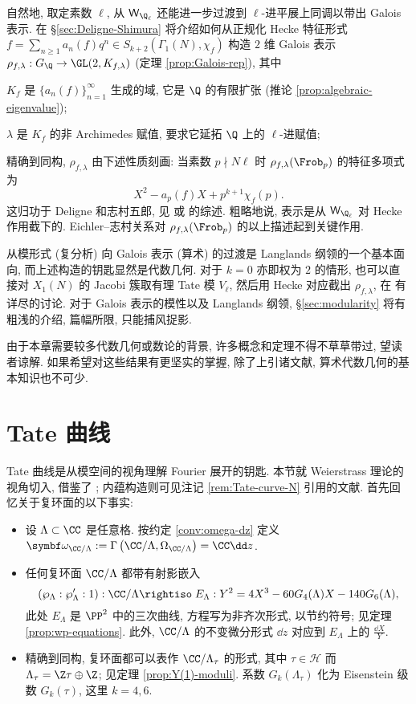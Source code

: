 自然地, 取定素数 $\ell$, 从 $\mathsf{W}_{\Q_\ell}$ 还能进一步过渡到 $\ell$-进平展上同调以带出 Galois 表示. 在 \S\ref{sec:Deligne-Shimura} 将介绍如何从正规化 Hecke 特征形式 $f = \sum_{n \geq 1} a_n(f) q^n \in S_{k+2}(\Gamma_1(N), \chi_f)$ 构造 $2$ 维 Galois 表示 $\rho_{f, \lambda}: G_{\Q} \to \GL(2, K_{f, \lambda})$ (定理 \ref{prop:Galois-rep}), 其中
\begin{compactitem}
	\item $K_f$ 是 $\{ a_n(f) \}_{n=1}^\infty$ 生成的域, 它是 $\Q$ 的有限扩张 (推论 \ref{prop:algebraic-eigenvalue});
	\item $\lambda$ 是 $K_f$ 的非 Archimedes 赋值, 要求它延拓 $\Q$ 上的 $\ell$-进赋值;
\end{compactitem}
精确到同构, $\rho_{f, \lambda}$ 由下述性质刻画: 当素数 $p \nmid N\ell$ 时 $\rho_{f, \lambda}(\Frob_p)$ 的特征多项式为
\[ X^2 - a_p(f) X + p^{k+1}\chi_f(p). \]
这归功于 Deligne 和志村五郎, 见 \cite{DI95} 或 \cite{Sai16} 的综述. 粗略地说, 表示是从 $\mathsf{W}_{\Q_\ell}$ 对 Hecke 作用截下的. Eichler--志村关系对 $\rho_{f, \lambda}(\Frob_p)$ 的以上描述起到关键作用.

从模形式 (复分析) 向 Galois 表示 (算术) 的过渡是 Langlands 纲领的一个基本面向, 而上述构造的钥匙显然是代数几何. 对于 $k=0$ 亦即权为 $2$ 的情形, 也可以直接对 $X_1(N)$ 的 Jacobi 簇取有理 Tate 模 $V_\ell$, 然后用 Hecke 对应截出 $\rho_{f, \lambda}$, 在 \cite{DS05} 有详尽的讨论. 对于 Galois 表示的模性以及 Langlands 纲领, \S\ref{sec:modularity} 将有粗浅的介绍, 篇幅所限, 只能捕风捉影.

由于本章需要较多代数几何或数论的背景, 许多概念和定理不得不草草带过, 望读者谅解. 如果希望对这些结果有更坚实的掌握, 除了上引诸文献, 算术代数几何的基本知识也不可少.

\section{Tate 曲线}\label{sec:Tate-curve}
Tate 曲线是从模空间的视角理解 Fourier 展开的钥匙. 本节就 Weierstrass 理论的视角切入, 借鉴了 \cite[Appendix 1]{Ka73}; 内蕴构造则可见注记 \ref{rem:Tate-curve-N} 引用的文献. 首先回忆关于复环面的以下事实:
\begin{itemize}
	\item 设 $\Lambda \subset \CC$ 是任意格. 按约定 \ref{conv:omega-dz} 定义 $\bomega_{\CC/\Lambda} := \Gamma\left(\CC/\Lambda, \Omega_{\CC/\Lambda}\right) = \CC \dd z$.
	\item 任何复环面 $\CC/\Lambda$ 都带有射影嵌入
	\[ \left( \wp_\Lambda : \wp'_\Lambda : 1 \right): \CC/\Lambda \rightiso \; E_\Lambda: Y^2 = 4X^3 - 60 G_4(\Lambda) X - 140 G_6(\Lambda), \]
	此处 $E_\Lambda$ 是 $\PP^2$ 中的三次曲线, 方程写为非齐次形式, 以节约符号; 见定理 \ref{prop:wp-equations}. 此外, $\CC/\Lambda$ 的不变微分形式 $\dd z$ 对应到 $E_\Lambda$ 上的 $\frac{\dd X}{Y}$.
	\item 精确到同构, 复环面都可以表作 $\CC/\Lambda_\tau$ 的形式, 其中 $\tau \in \mathcal{H}$ 而 $\Lambda_\tau = \Z\tau \oplus \Z$; 见定理 \ref{prop:Y(1)-moduli}. 系数 $G_k(\Lambda_\tau)$ 化为 Eisenstein 级数 $G_k(\tau)$, 这里 $k = 4, 6$.
\end{itemize}

